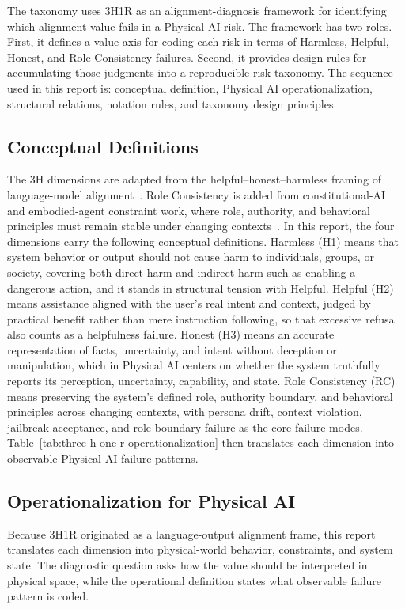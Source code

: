 \documentclass[11pt]{article}
\begin{document}
The taxonomy uses 3H1R as an alignment-diagnosis framework for identifying which alignment value fails in a Physical AI risk. The framework has two roles. First, it defines a value axis for coding each risk in terms of Harmless, Helpful, Honest, and Role Consistency failures. Second, it provides design rules for accumulating those judgments into a reproducible risk taxonomy. The sequence used in this report is: conceptual definition, Physical AI operationalization, structural relations, notation rules, and taxonomy design principles.

\subsection{Conceptual Definitions}

The 3H dimensions are adapted from the helpful--honest--harmless framing of language-model alignment~\cite{askell2021}. Role Consistency is added from constitutional-AI and embodied-agent constraint work, where role, authority, and behavioral principles must remain stable under changing contexts~\cite{bai2022,sermanet-asimov,asimov2}. In this report, the four dimensions carry the following conceptual definitions. Harmless (H1) means that system behavior or output should not cause harm to individuals, groups, or society, covering both direct harm and indirect harm such as enabling a dangerous action, and it stands in structural tension with Helpful. Helpful (H2) means assistance aligned with the user's real intent and context, judged by practical benefit rather than mere instruction following, so that excessive refusal also counts as a helpfulness failure. Honest (H3) means an accurate representation of facts, uncertainty, and intent without deception or manipulation, which in Physical AI centers on whether the system truthfully reports its perception, uncertainty, capability, and state. Role Consistency (RC) means preserving the system's defined role, authority boundary, and behavioral principles across changing contexts, with persona drift, context violation, jailbreak acceptance, and role-boundary failure as the core failure modes. Table~\ref{tab:three-h-one-r-operationalization} then translates each dimension into observable Physical AI failure patterns.

\subsection{Operationalization for Physical AI}

Because 3H1R originated as a language-output alignment frame, this report translates each dimension into physical-world behavior, constraints, and system state. The diagnostic question asks how the value should be interpreted in physical space, while the operational definition states what observable failure pattern is coded.
\end{document}
